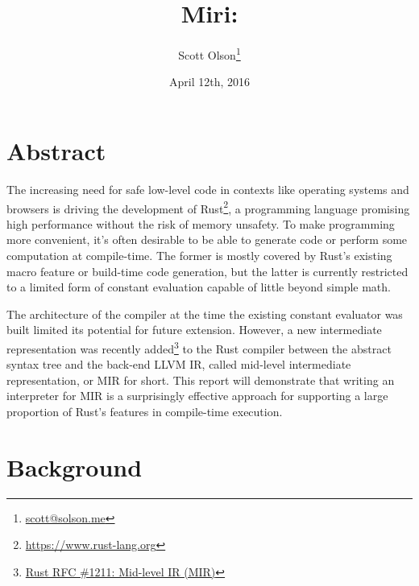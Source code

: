 \documentclass[twocolumn]{article}
\begin{document}
\title{Miri: \\ }
\author{Scott Olson\footnote{\href{mailto:scott@solson.me}{scott@solson.me}} \\
  }
\date{April 12th, 2016}
\maketitle


\section{Abstract}

The increasing need for safe low-level code in contexts like operating systems and browsers is
driving the development of Rust\footnote{\url{https://www.rust-lang.org}}, a programming language
promising high performance without the risk of memory unsafety. To make programming more convenient,
it's often desirable to be able to generate code or perform some computation at compile-time. The
former is mostly covered by Rust's existing macro feature or build-time code generation, but the
latter is currently restricted to a limited form of constant evaluation capable of little beyond
simple math.

The architecture of the compiler at the time the existing constant evaluator was built limited its
potential for future extension. However, a new intermediate representation was recently
added\footnote{\href{https://github.com/rust-lang/rfcs/blob/master/text/1211-mir.md}{Rust RFC \#1211: Mid-level IR (MIR)}}
to the Rust compiler between the abstract syntax tree and the back-end LLVM IR, called mid-level
intermediate representation, or MIR for short. This report will demonstrate that writing an
interpreter for MIR is a surprisingly effective approach for supporting a large proportion of Rust's
features in compile-time execution.


\section{Background}
\end{document}
